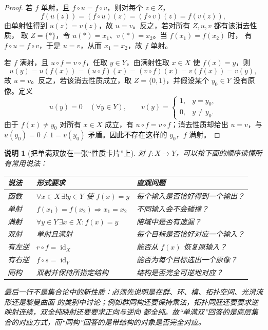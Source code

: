 \documentclass[UTF8,fontset=none,a4paper,11pt]{ctexart}
\theoremstyle{foundation-definition}
\theoremstyle{foundation-theorem}
\theoremstyle{foundation-proposition}
\theoremstyle{foundation-example}
\theoremstyle{foundation-remark}
\newtheorem{remark}[definition]{说明}
\theoremstyle{foundation-theorem}
\begin{document}
\begin{proof}
若 \(f\) 单射，且 \(f\circ u=f\circ v\)，则对每个 \(z\in Z\)，
\[
 f(u(z))=(f\circ u)(z)=(f\circ v)(z)=f(v(z)),
\]
由单射性得到 \(u(z)=v(z)\)，故 \(u=v\)。反之，若对所有 \(Z,u,v\) 都有该消去性质，
取 \(Z=\{\ast\}\)，令 \(u(\ast)=x_1\)、\(v(\ast)=x_2\)。当 \(f(x_1)=f(x_2)\) 时，
有 \(f\circ u=f\circ v\)，于是 \(u=v\)，从而 \(x_1=x_2\)，故 \(f\) 单射。

若 \(f\) 满射，且 \(u\circ f=v\circ f\)，任取 \(y\in Y\)，由满射性取 \(x\in X\) 使
\(f(x)=y\)，则
\[
u(y)=u(f(x))=(u\circ f)(x)=(v\circ f)(x)=v(f(x))=v(y),
\]
故 \(u=v\)。反之，若该消去性质成立，取 \(Z=\{0,1\}\)，并假设某个
\(y_0\in Y\) 没有原像。定义
\[
u(y)=0\quad(\forall y\in Y),\qquad
v(y)=\begin{cases}1,&y=y_0,\\0,&y\ne y_0.
\end{cases}
\]
由于 \(f(x)\ne y_0\) 对所有 \(x\in X\) 成立，有 \(u\circ f=v\circ f\)；消去性质却给出
\(u=v\)，与 \(u(y_0)=0\ne1=v(y_0)\) 矛盾。因此不存在这样的 \(y_0\)，\(f\) 满射。
\end{proof}

\begin{remark}[把单满双放在一张“性质卡片”上]\label{rem:map-property-card}
对 \(f:X\to Y\)，可以按下面的顺序读懂所有常用说法：
\begin{center}
\begin{tabularx}{\textwidth}{p{}p{}X}
\toprule
说法 & 形式要求 & 直观问题 \\
\midrule
函数 & \(\forall x\in X\,\exists!y\in Y\) 使 \(f(x)=y\) & 每个输入是否恰好得到一个输出？ \\
单射 & \(f(x_1)=f(x_2)\Rightarrow x_1=x_2\) & 不同输入会不会碰撞？ \\
满射 & \(\forall y\in Y\,\exists x\in X:f(x)=y\) & 陪域中是否有遗漏？ \\
双射 & 单射且满射 & 每个目标是否恰好对应一个输入？ \\
有左逆 & \(r\circ f=\operatorname{id}_X\) & 能否从 \(f(x)\) 恢复原输入？ \\
有右逆 & \(f\circ s=\operatorname{id}_Y\) & 能否为每个目标选出一个原像？ \\
同构 & 双射并保持所指定结构 & 结构是否完全可逆地对应？ \\
\bottomrule
\end{tabularx}
\end{center}
最后一行不是集合论中的新性质：必须先说明是在群、环、模、拓扑空间、光滑流形还是黎曼曲面
的类别中讨论；例如群同构还要保持乘法，拓扑同胚还要要求逆映射连续，双全纯映射还要要求正向与逆向
都全纯。故“单满双”回答的是底层集合的对应方式，而“同构”回答的是带结构的对象是否完全对应。
\end{remark}
\end{document}
